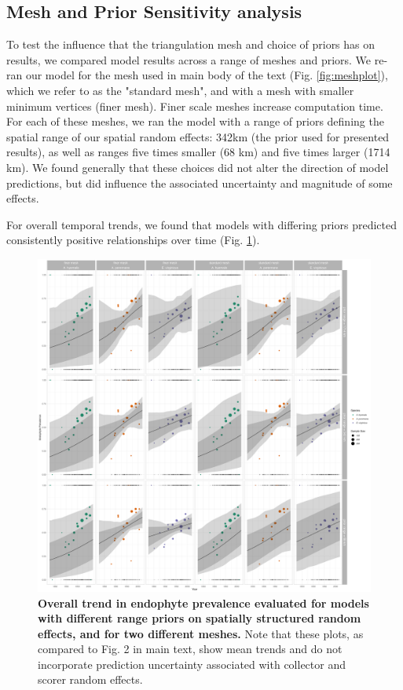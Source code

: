 \documentclass[11pt]{article}
\begin{document}
\subsection*{Mesh and Prior Sensitivity analysis}\label{sec:priorsensitivity}
To test the influence that the triangulation mesh and choice of priors has on results, we compared model results across a range of meshes and priors. We re-ran our model for the mesh used in main body of the text (Fig. \ref{fig:meshplot}), which we refer to as the "standard mesh", and with a mesh with smaller minimum vertices (finer mesh). Finer scale meshes increase computation time. For each of these meshes, we ran the model with a range of priors defining the spatial range of our spatial random effects: 342km (the prior used for presented results), as well as ranges five times smaller (68 km) and five times larger (1714 km). We found generally that these choices did not alter the direction of model predictions, but did influence the associated uncertainty and magnitude of some effects.

For overall temporal trends, we found that models with differing priors predicted consistently positive relationships over time (Fig. \ref{fig:prior_year_plot}). 


\begin{figure}[H]
	\centering
	\includegraphics[width = \linewidth]{../Plots/prior_comparison_year_plot.png}
	\caption[Overall trend in endophyte prevalence evaluated for models with different range priors on spatially structured random effects, and for two different meshes]{\textbf{Overall trend in endophyte prevalence evaluated for models with different range priors on spatially structured random effects, and for two different meshes.} Note that these plots, as compared to Fig. 2 in main text, show mean trends and do not incorporate prediction uncertainty associated with collector and scorer random effects.}
	\label{fig:prior_year_plot}
\end{figure}
\end{document}
